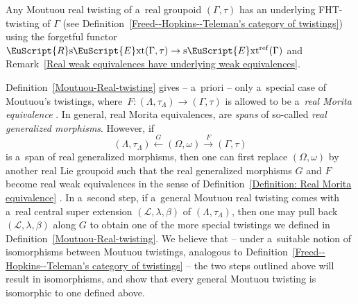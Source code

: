 \documentclass[pdftex]{sigma}
\numberwithin{equation}{section}
\def\mathscr#1{\EuScript{#1}}
\def\sExt{\normalfont\text{s}\mathscr{E}\text{xt}}
\def\RsExt{\normalfont\mathscr{R}\text{s}\mathscr{E}\text{xt}}
\begin{document}
\begin{Remark} \label{Remark: Real twistings have underlying FHT twistings}
 Any Moutuou real twisting of a~real groupoid $(\Gamma,\tau)$ has an underlying FHT-twisting of $\Gamma$ (see Definition~\ref{Freed--Hopkins--Teleman's category of twistings})
 using the forgetful functor $\RsExt(\Gamma,\tau) \to \sExt^{\mathrm{ref}}(\Gamma)$ and Remark~\ref{Real weak equivalences have underlying weak equivalences}.
\end{Remark}

\begin{Remark}
 Definition~\ref{Moutuou-Real-twisting} gives -- a~priori -- only a~special case of Moutuou's twistings, where~${F\colon (\Lambda,\tau_{\Lambda}) \to (\Gamma,\tau)}$ is allowed to be a~\emph{real Morita equivalence} \cite[Definitions~2.4.1 and~2.6.3]{mohamedmoutuou2012}.
In general, real Morita equivalences, are \emph{spans} of so-called \emph{real generalized morphisms}. However, if
\begin{equation*}
(\Lambda,\tau_{\Lambda}) \stackrel G\leftarrow (\Omega,\omega) \stackrel F\to (\Gamma,\tau)
\end{equation*}
is a~span of real generalized morphisms, then one can first replace $(\Omega,\omega)$ by another real Lie groupoid such that the real generalized morphisms $G$ and $F$ become real weak equivalences in the sense of Definition~\ref{Definition: Real Morita equivalence} \cite[Proposition~2.4.9]{mohamedmoutuou2012}.
In a~second step, if a~general Moutuou real twisting comes with a~real central super extension $(\mathcal{L},\lambda,\beta)$ of $(\Lambda,\tau_{\Lambda})$, then one may pull back~${(\mathcal{L},\lambda,\beta)}$ along $G$ to obtain one of the more special twistings we defined in Definition~\ref{Moutuou-Real-twisting}. We believe that -- under a~suitable notion of isomorphisms between Moutuou twistings, analogous to Definition~\ref{Freed--Hopkins--Teleman's category of twistings} -- the two steps outlined above will result in isomorphisms, and show that every general Moutuou twisting is isomorphic to one defined above.
\end{Remark}
\end{document}
